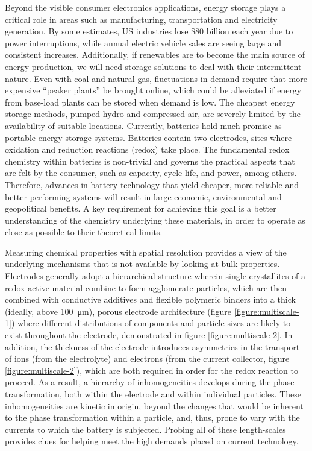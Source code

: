 \documentclass[journal=cmatex,manuscript=perspective]{achemso}
\begin{document}
Beyond the visible consumer electronics applications, energy storage
plays a critical role in areas such as manufacturing, transportation
and electricity generation. By some estimates, US industries lose \$80
billion each year due to power interruptions, while annual electric
vehicle sales are seeing large and consistent
increases\cite{whittingham2012}. Additionally, if renewables are to
become the main source of energy production, we will need storage
solutions to deal with their intermittent nature. Even with coal and
natural gas, fluctuations in demand require that more expensive
``peaker plants'' be brought online, which could be alleviated if
energy from base-load plants can be stored when demand is low. The
cheapest energy storage methods, pumped-hydro and compressed-air, are
severely limited by the availability of suitable locations. Currently,
batteries hold much promise as portable energy storage
systems. Batteries contain two electrodes, sites where oxidation and
reduction reactions (redox) take place\cite{armand2008}. The
fundamental redox chemistry within batteries is non-trivial and
governs the practical aspects that are felt by the consumer, such as
capacity, cycle life, and power, among others. Therefore, advances in
battery technology that yield cheaper, more reliable and better
performing systems will result in large economic, environmental and
geopolitical benefits. A key requirement for achieving this goal is a
better understanding of the chemistry underlying these materials, in
order to operate as close as possible to their theoretical limits.

Measuring chemical properties with spatial resolution provides a view
of the underlying mechanisms that is not available by looking at bulk
properties. Electrodes generally adopt a hierarchical structure
wherein single crystallites of a redox-active material combine to form
agglomerate particles, which are then combined with conductive
additives and flexible polymeric binders into a thick (ideally, above
\SI{100}{\micro\metre}), porous electrode architecture (figure
\ref{figure:multiscale-1}) where different distributions of components
and particle sizes are likely to exist throughout the electrode,
demonstrated in figure \ref{figure:multiscale-2}. In addition, the
thickness of the electrode introduces asymmetries in the transport of
ions (from the electrolyte) and electrons (from the current collector,
figure \ref{figure:multiscale-2}), which are both required in order
for the redox reaction to proceed. As a result, a hierarchy of
inhomogeneities develops during the phase transformation, both within
the electrode\cite{newman1995,srinivasan2014} and within individual
particles. These inhomogeneities are kinetic in origin, beyond the
changes that would be inherent to the phase transformation within a
particle, and, thus, prone to vary with the currents to which the
battery is subjected. Probing all of these length-scales provides
clues for helping meet the high demands placed on current technology.
\end{document}
